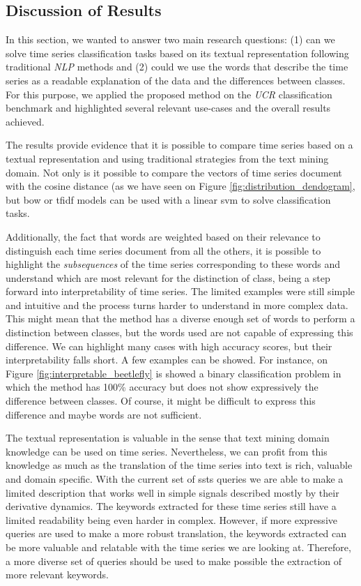 \subsection{Discussion of Results}

In this section, we wanted to answer two main research questions: (1) can we solve time series classification tasks based on its textual representation following traditional \textit{NLP} methods and (2) could we use the words that describe the time series as a readable explanation of the data and the differences between classes. For this purpose, we applied the proposed method on the \textit{UCR} classification benchmark and highlighted several relevant use-cases and the overall results achieved.
\par
The results provide evidence that it is possible to compare time series based on a textual representation and using traditional strategies from the text mining domain. Not only is it possible to compare the vectors of time series document with the cosine distance (as we have seen on Figure \ref{fig:distribution_dendogram}, but \gls{bow} or \gls{tfidf} models can be used with a linear \gls{svm} to solve classification tasks.
\par
Additionally, the fact that words are weighted based on their relevance to distinguish each time series document from all the others, it is possible to highlight the \textit{subsequences} of the time series corresponding to these words and understand which are most relevant for the distinction of class, being a step forward into interpretability of time series. The limited examples were still simple and intuitive and the process turns harder to understand in more complex data. This might mean that the method has a diverse enough set of words to perform a distinction between classes, but the words used are not capable of expressing this difference. We can highlight many cases with high accuracy scores, but their interpretability falls short. A few examples can be showed. For instance, on Figure \ref{fig:interpretable_beetlefly} is showed a binary classification problem in which the method has 100\% accuracy but does not show expressively the difference between classes. Of course, it might be difficult to express this difference and maybe words are not sufficient. 
\par
The textual representation is valuable in the sense that text mining domain knowledge can be used on time series. Nevertheless, we can profit from this knowledge as much as the translation of the time series into text is rich, valuable and domain specific. With the current set of \gls{ssts} queries we are able to make a limited description that works well in simple signals described mostly by their derivative dynamics. The keywords extracted for these time series still have a limited readability being even harder in complex. However, if more expressive queries are used to make a more robust translation, the keywords extracted can be more valuable and relatable with the time series we are looking at. Therefore, a more diverse set of queries should be used to make possible the extraction of more relevant keywords.

